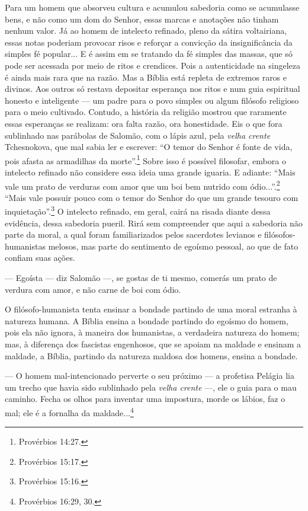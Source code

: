 Para um homem que absorveu cultura e acumulou sabedoria como se
acumulasse bens, e não como um dom do Senhor, essas marcas e anotações
não tinham nenhum valor. Já ao homem de intelecto refinado, pleno da
sátira voltairiana, essas notas poderiam provocar risos e reforçar a
convicção da insignificância da simples fé popular... E é assim em se
tratando da fé simples das massas, que só pode ser acessada por meio de
ritos e crendices. Pois a autenticidade na singeleza é ainda mais rara
que na razão. Mas a Bíblia está repleta de extremos raros e divinos. Aos
outros só restava depositar esperança nos ritos e num guia espiritual
honesto e inteligente --- um padre para o povo simples ou algum filósofo
religioso para o meio cultivado. Contudo, a história da religião mostrou
que raramente essas esperanças se realizam: ora falta razão, ora
honestidade. Eis o que fora sublinhado nas parábolas de Salomão, com o
lápis azul, pela \emph{velha crente} Tchesnokova, que mal sabia ler e
escrever: ``O temor do Senhor é fonte de vida, pois afasta as armadilhas
da morte''.\footnote{Provérbios 14:27.} Sobre isso é possível filosofar,
embora o intelecto refinado não considere essa ideia uma grande iguaria.
E adiante: ``Mais vale um prato de verduras com amor que um boi bem
nutrido com ódio...''.\footnote{Provérbios 15:17.} ``Mais vale possuir
pouco com o temor do Senhor do que um grande tesouro com
inquietação''.\footnote{Provérbios 15:16.} O intelecto refinado, em
geral, cairá na risada diante dessa evidência, dessa sabedoria pueril.
Rirá sem compreender que aqui a sabedoria não parte da moral, a qual
foram familiarizados pelos sacerdotes levianos e filósofos-humanistas
melosos, mas parte do sentimento de egoísmo pessoal, ao que de fato
confiam suas ações.

--- Egoísta --- diz Salomão ---, se gostas de ti mesmo, comerás um prato
de verdura com amor, e não carne de boi com ódio.

O filósofo-humanista tenta ensinar a bondade partindo de uma moral
estranha à natureza humana. A Bíblia ensina a bondade partindo do
egoísmo do homem, pois ela não ignora, à maneira dos humanistas, a
verdadeira natureza do homem; mas, à diferença dos fascistas engenhosos,
que se apoiam na maldade e ensinam a maldade, a Bíblia, partindo da
natureza maldosa dos homens, ensina a bondade.

--- O homem mal-intencionado perverte o seu próximo --- a profetisa
Pelágia lia um trecho que havia sido sublinhado pela \emph{velha crente}
---, ele o guia para o mau caminho. Fecha os olhos para inventar uma
impostura, morde os lábios, faz o mal; ele é a fornalha da
maldade...\footnote{Provérbios 16:29, 30.}

